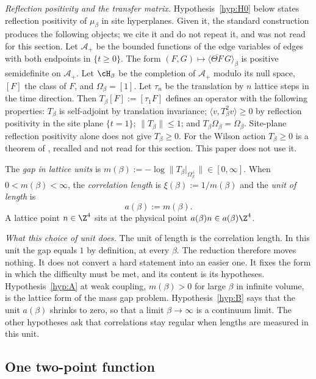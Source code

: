 \emph{Reflection positivity and the transfer matrix.} Hypothesis~\ref{hyp:H0} below states reflection positivity of $\mu_\beta$ in site hyperplanes. Given it, the standard construction \cite{OS78} produces the following objects; we cite it and do not repeat it, and \cite{OS78} was not read for this section. Let $\mathcal{A}_+$ be the bounded functions of the edge variables of edges with both endpoints in $\{t\ge0\}$. The form $(F,G)\mapsto\langle\overline{\Theta F}\,G\rangle_\beta$ is positive semidefinite on $\mathcal{A}_+$. Let $\cH_\beta$ be the completion of $\mathcal{A}_+$ modulo its null space, $[F]$ the class of $F$, and $\Omega_\beta=[1]$. Let $\tau_n$ be the translation by $n$ lattice steps in the time direction. Then $T_\beta[F]:=[\tau_1F]$ defines an operator with the following properties: $T_\beta$ is self-adjoint by translation invariance; $\langle v,T_\beta^2v\rangle\ge0$ by reflection positivity in the site plane $\{t=1\}$; $\|T_\beta\|\le1$; and $T_\beta\Omega_\beta=\Omega_\beta$. Site-plane reflection positivity alone does not give $T_\beta\ge0$. For the Wilson action $T_\beta\ge0$ is a theorem of \cite{Lu77}, recalled and not read for this section. This paper does not use it.

\begin{definition}\label{red:def-gap}
The \emph{gap in lattice units} is $m(\beta):=-\log\|T_\beta|_{\Omega_\beta^\perp}\|\in[0,\infty]$. When $0<m(\beta)<\infty$, the \emph{correlation length} is $\xi(\beta):=1/m(\beta)$ and the \emph{unit of length} is
\[
  a(\beta):=m(\beta).
\]
A lattice point $n\in\Z^4$ sits at the physical point $a(\beta)n\in a(\beta)\Z^4$.
\end{definition}

\emph{What this choice of unit does.} The unit of length is the correlation length. In this unit the gap equals $1$ by definition, at every $\beta$. The reduction therefore moves nothing. It does not convert a hard statement into an easier one. It fixes the form in which the difficulty must be met, and its content is its hypotheses. Hypothesis~\ref{hyp:A} at weak coupling, $m(\beta)>0$ for large $\beta$ in infinite volume, is the lattice form of the mass gap problem. Hypothesis~\ref{hyp:B} says that the unit $a(\beta)$ shrinks to zero, so that a limit $\beta\to\infty$ is a continuum limit. The other hypotheses ask that correlations stay regular when lengths are measured in this unit.

\subsection{One two-point function}\label{red:R}


